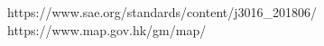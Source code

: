\documentclass[12pt]{article}
\newcommand{\wholepages}{20}
\theoremstyle{definition}
\theoremstyle{remark}
\numberwithin{equation}{section}
\begin{document}
	
	
	
	\newpage
	\thispagestyle{empty}
	\renewcommand\refname{References}
	\clearpage
	\begin{thebibliography}{100}
		https://www.sae.org/standards/content/j3016\_201806/
		https://www.map.gov.hk/gm/map/
		
	\end{thebibliography} 
	
\end{document}
